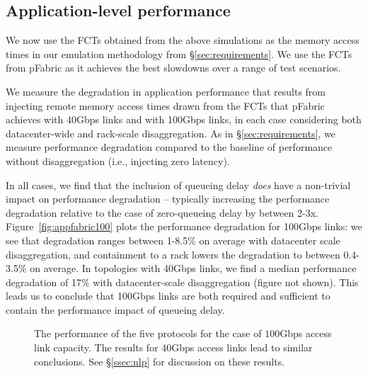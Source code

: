 \subsection{Application-level performance}
\label{ssec:alp}

We now use the FCTs obtained from the above simulations as the memory access times in our emulation methodology from \S\ref{sec:requirements}. We use the FCTs from pFabric as it achieves the best slowdowns over a range of test scenarios. 

We measure the degradation in application performance that results from injecting remote memory access times drawn from the FCTs that pFabric achieves with 40Gbps links and with 100Gbps links, in each case considering both datacenter-wide and rack-scale disaggregation. As in \S\ref{sec:requirements}, we measure performance degradation compared to the baseline of performance without disaggregation (i.e., injecting zero latency). 

In all cases, we find that the inclusion of queueing delay \emph{does} have a non-trivial impact on performance degradation -- typically increasing the performance degradation relative to the case of zero-queueing delay by between 2-3x. 
Figure~\ref{fig:appfabric100} plots the performance degradation for 100Gbps links: we see that degradation ranges between 1-8.5\% on average with datacenter scale disaggregation, and containment to a rack lowers the degradation to between 0.4-3.5\% on average. In topologies with 40Gbps links, we find a median performance degradation of 17\% with datacenter-scale disaggregation (figure not shown). 
This leads us to conclude that 100Gbps links are both required and sufficient to contain the performance impact of queueing delay.

\begin{figure}
  \centering
  \caption{\small{The performance of the five protocols for the case of $100$Gbps access link capacity. The results for $40$Gbps access links lead to similar conclusions. See \S\ref{ssec:nlp} for discussion on these results.}}
  \label{fig:phostp}
\end{figure}


